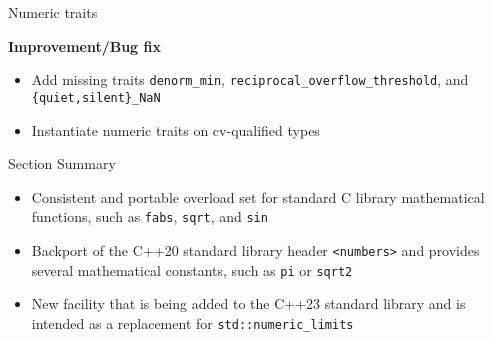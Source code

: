 
\begin{frame}[fragile]{Numeric traits}

\textbf{Improvement/Bug fix}

\begin{itemize}
  \item{Add missing traits \texttt{denorm\_min}, \texttt{reciprocal\_overflow\_threshold}, and \texttt{\{quiet,silent\}\_NaN}}
  \item{Instantiate numeric traits on cv-qualified types}
\end{itemize}

\end{frame}


\begin{frame}{Section Summary}

  \begin{itemize}
    \item{Consistent and portable overload set for standard C library mathematical functions, such as \texttt{fabs}, \texttt{sqrt}, and \texttt{sin}}
    \item{Backport of the C++20 standard library header \texttt{<numbers>} and provides several mathematical constants, such as \texttt{pi} or \texttt{sqrt2}}
    \item{New facility that is being added to the C++23 standard library and is intended as a replacement for \texttt{std::numeric\_limits}}
  \end{itemize}

\end{frame}
